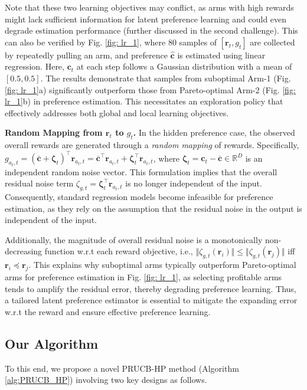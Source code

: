 Note that these two learning objectives may conflict, as arms with high rewards might lack sufficient information for latent preference learning and could even degrade estimation performance (further discussed in the second challenge). 
This can also be verified by Fig. \ref{fig: lr_1}, where 80 samples of $[\boldsymbol{r}_{t}, g_{t}]$ are collected by repeatedly pulling an arm, and preference $\boldsymbol{\hat{c}}$ is estimated using linear regression. Here, $\boldsymbol{c}_t$ at each step follows a Gaussian distribution with a mean of $[0.5, 0.5]$. The results demonstrate that samples from suboptimal Arm-1 (Fig. \ref{fig: lr_1}a) significantly outperform those from Pareto-optimal Arm-2 (Fig. \ref{fig: lr_1}b) in preference estimation.
This necessitates an exploration policy that effectively addresses both global and local learning objectives.

\textbf{Random Mapping from $\boldsymbol{r}_t$ to $g_t$.}
In the hidden preference case, the observed overall rewards are generated through a \emph{random mapping} of rewards.
Specifically,
$g_{a_t,t} = (\boldsymbol{\overline{c}} + \boldsymbol{\zeta}_t)^{\top} \boldsymbol{r}_{a_t,t} = \boldsymbol{\overline{c}}^{\top} \boldsymbol{r}_{a_t,t} + \boldsymbol{\zeta}_t^{\top} \boldsymbol{r}_{a_t,t}$, where $\boldsymbol{\zeta}_t = \boldsymbol{c}_t - \boldsymbol{\overline{c}} \in \mathbb{R}^D$ is an independent random noise vector. 
This formulation implies that the overall residual noise term $\zeta_{g,t} = \boldsymbol{\zeta}_t^{\top} \boldsymbol{r}_{a_t,t}$ is no longer independent of the input.
Consequently, standard regression models become infeasible for preference estimation, as they rely on the assumption that the residual noise in the output is independent of the input.

Additionally, the magnitude of overall residual noise is a monotonically non-decreasing function w.r.t each reward objective, i.e., 
$\Vert \zeta_{g,t}(\boldsymbol{r}_{i}) \Vert \leq \Vert \zeta_{g,t}(\boldsymbol{r}_{j}) \Vert$ iff $\boldsymbol{r}_{i} \preceq \boldsymbol{r}_{j}$.
This explains why suboptimal arms typically outperform Pareto-optimal arms for preference estimation in Fig. \ref{fig: lr_1}, as selecting profitable arms tends to amplify the residual error, thereby degrading preference learning.
Thus, a tailored latent preference estimator is essential to mitigate the expanding error w.r.t the reward and ensure effective preference learning.



\subsection{Our Algorithm}
To this end, we propose a novel PRUCB-HP method (Algorithm \ref{alg:PRUCB_HP}) involving two key designs as follows.

